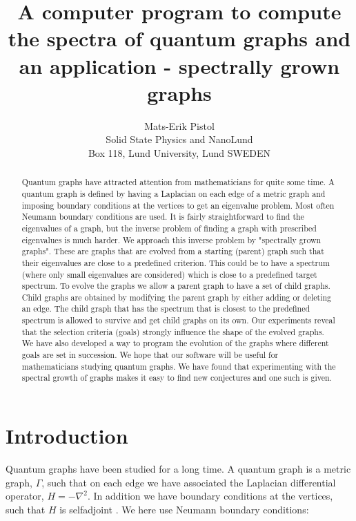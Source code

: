\documentclass[a4paper]{article}
\title{A computer program to compute the spectra of quantum graphs and an application - spectrally grown graphs}
\author{Mats-Erik Pistol\\ Solid State Physics and NanoLund\\ Box 118, Lund University, Lund SWEDEN}
\begin{document}
\maketitle

\begin{abstract}
Quantum graphs have attracted attention from mathematicians for quite some time. A quantum graph is defined by having a Laplacian on each edge of a metric graph and imposing boundary conditions at the vertices to get an eigenvalue problem. Most often Neumann boundary conditions are used. It is fairly straightforward to find the eigenvalues of a graph, but the inverse problem of finding a graph with prescribed eigenvalues is much harder. We approach this inverse problem by "spectrally grown graphs". These are graphs that are evolved from a starting (parent) graph such that their eigenvalues are close to a predefined criterion. This could be to have a spectrum (where only small eigenvalues are considered) which is close to a predefined target spectrum. To evolve the graphs we allow a parent graph to have a set of child graphs. Child graphs are obtained by modifying the parent graph by either adding or deleting an edge. The child graph that has the spectrum that is closest to the predefined spectrum is allowed to survive and get child graphs on its own. Our experiments reveal that the selection criteria (goals) strongly influence the shape of the evolved graphs. We have also developed a way to program the evolution of the graphs where different goals are set in succession.
We hope that our software will be useful for mathematicians studying quantum graphs. We have found that experimenting with the spectral growth of graphs makes it easy to find new conjectures and one such is given.

\end{abstract}

\section{Introduction}

Quantum graphs have been studied for a long time. A quantum graph \cite{kuchment2004quantum} is a metric graph, $\Gamma$, such that on each edge we have associated the Laplacian differential operator, $H=-\nabla^2$. In addition we have boundary conditions at the vertices, such that $H$ is selfadjoint \cite{kostrykin1999kirchhoff}. We here use Neumann boundary conditions:
      
\end{document}
